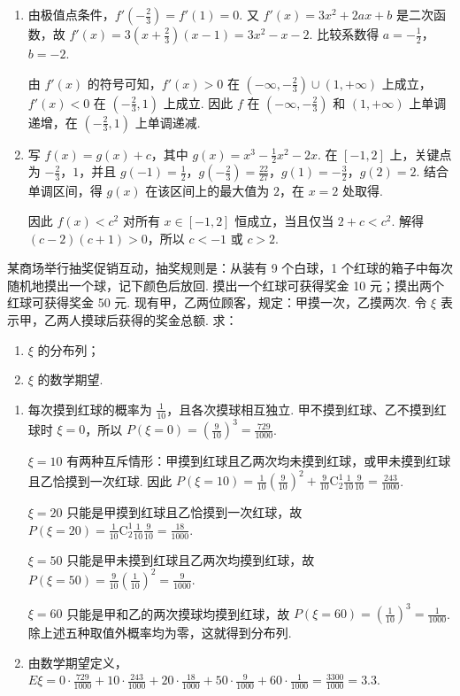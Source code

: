 \begin{solution}
\begin{enumerate}
\item 由极值点条件，\(f'(-\frac{2}{3})=f'(1)=0\). 又 \(f'(x)=3x^2+2ax+b\) 是二次函数，故
\(f'(x)=3\left(x+\frac23\right)(x-1)=3x^2-x-2\). 比较系数得 \(a=-\frac12\)，\(b=-2\).

由 \(f'(x)\) 的符号可知，\(f'(x)>0\) 在 \((-\infty,-\frac{2}{3})\cup(1,+\infty)\) 上成立，\(f'(x)<0\) 在 \((-\frac{2}{3},1)\) 上成立. 因此 \(f\) 在 \((-\infty,-\frac{2}{3})\) 和 \((1,+\infty)\) 上单调递增，在 \((-\frac{2}{3},1)\) 上单调递减.
\item 写 \(f(x)=g(x)+c\)，其中 \(g(x)=x^3-\frac12x^2-2x\). 在 \([-1,2]\) 上，关键点为 \(-\frac{2}{3}\)，\(1\)，并且
\(g(-1)=\frac{1}{2}\)，\(g(-\frac{2}{3})=\frac{22}{27}\)，\(g(1)=-\frac{3}{2}\)，\(g(2)=2\). 结合单调区间，得 \(g(x)\) 在该区间上的最大值为 \(2\)，在 \(x=2\) 处取得.

因此 \(f(x)<c^2\) 对所有 \(x\in[-1,2]\) 恒成立，当且仅当 \(2+c<c^2\). 解得 \((c-2)(c+1)>0\)，所以 \(c<-1\) 或 \(c>2\).
\end{enumerate}
\end{solution}

\begin{problem}
某商场举行抽奖促销互动，抽奖规则是：从装有 9 个白球，1 个红球的箱子中每次随机地摸出一个球，记下颜色后放回. 摸出一个红球可获得奖金 10 元；摸出两个红球可获得奖金 50 元. 现有甲，乙两位顾客，规定：甲摸一次，乙摸两次. 令 \(\xi\) 表示甲，乙两人摸球后获得的奖金总额. 求：

\begin{enumerate}
\item \(\xi\) 的分布列；
\item \(\xi\) 的数学期望.
\end{enumerate}
\end{problem}

\begin{solution}
\begin{enumerate}
\item 每次摸到红球的概率为 \(\frac{1}{10}\)，且各次摸球相互独立. 甲不摸到红球、乙不摸到红球时 \(\xi=0\)，所以 \(P(\xi=0)=(\frac{9}{10})^3=\frac{729}{1000}\).

\(\xi=10\) 有两种互斥情形：甲摸到红球且乙两次均未摸到红球，或甲未摸到红球且乙恰摸到一次红球. 因此 \(P(\xi=10)=\frac1{10}(\frac9{10})^2+\frac9{10}\mathrm C_2^1\frac1{10}\frac9{10}=\frac{243}{1000}\).

\(\xi=20\) 只能是甲摸到红球且乙恰摸到一次红球，故 \(P(\xi=20)=\frac1{10}\mathrm C_2^1\frac1{10}\frac9{10}=\frac{18}{1000}\).

\(\xi=50\) 只能是甲未摸到红球且乙两次均摸到红球，故 \(P(\xi=50)=\frac9{10}(\frac1{10})^2=\frac{9}{1000}\).

\(\xi=60\) 只能是甲和乙的两次摸球均摸到红球，故 \(P(\xi=60)=(\frac{1}{10})^3=\frac{1}{1000}\). 除上述五种取值外概率均为零，这就得到分布列.
\item 由数学期望定义，
\(E\xi=0\cdot\frac{729}{1000}+10\cdot\frac{243}{1000}+20\cdot\frac{18}{1000}+50\cdot\frac9{1000}+60\cdot\frac1{1000}=\frac{3300}{1000}=3.3\).
\end{enumerate}
\end{solution}

